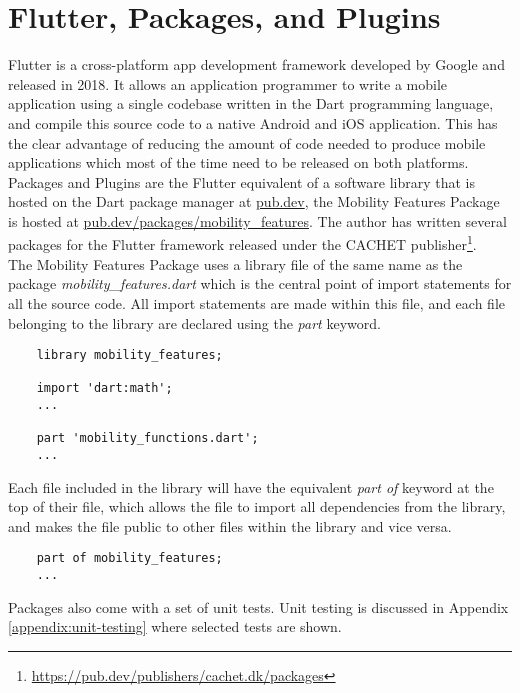 \section{Flutter, Packages, and Plugins}
Flutter is a cross-platform app development framework developed by Google and released in 2018. It allows an application programmer to write a mobile application using a single codebase written in the Dart programming language, and compile this source code to a native Android and iOS application. This has the clear advantage of reducing the amount of code needed to produce mobile applications which most of the time need to be released on both platforms. Packages and Plugins are the Flutter equivalent of a software library that is hosted on the Dart package manager at \url{pub.dev}, the Mobility Features Package is hosted at \url{pub.dev/packages/mobility_features}. The author has written several packages for the Flutter framework released under the CACHET publisher\footnote{\url{https://pub.dev/publishers/cachet.dk/packages}}.\\ 

The Mobility Features Package uses a library file of the same name as the package \textit{mobility\_features.dart} which is the central point of import statements for all the source code. All import statements are made within this file, and each file belonging to the library are declared using the \textit{part} keyword.

\begin{verbatim}
    library mobility_features;
    
    import 'dart:math';
    ...
    
    part 'mobility_functions.dart';
    ...
\end{verbatim}

Each file included in the library will have the equivalent \textit{part of} keyword at the top of their file, which allows the file to import all dependencies from the library, and makes the file public to other files within the library and vice versa.

\begin{verbatim}
    part of mobility_features;
    ...
\end{verbatim}

Packages also come with a set of unit tests. Unit testing is discussed in Appendix \ref{appendix:unit-testing} where selected tests are shown.